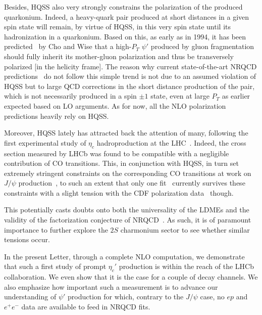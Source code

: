 \documentclass[showpacs,aps,PRL,twocolumn,footinbib,11]{revtex4-1}
\def\jpsi{J/\psi}
\def\psip{\psi'}
\def\etac{\eta_c}
\def\etacp{\eta_c'}
\begin{document}
Besides, HQSS also very strongly constrains the polarization of the produced quarkonium.
Indeed, a heavy-quark pair produced at short distances in a given spin state 
will remain, by virtue of HQSS, in this very spin state until its hadronization in a quarkonium. Based on this, 
as early as in 1994, it has been predicted~\cite{Cho:1994ih} by Cho and Wise that a high-$P_T$ $\psi'$ 
produced by gluon fragmentation should fully inherit
its mother-gluon polarization and thus be transversely polarized [in the helicity frame]. 
The reason why current state-of-the-art NRQCD predictions~\cite{Cho:1994ih} do not follow this 
simple trend is not due to an assumed
violation of HQSS but to large QCD corrections in the short distance production of
the pair, which is not necessarily produced in a spin $\pm 1$ state, even at large $P_T$ 
as earlier expected based on LO arguments. As for now, all the NLO polarization predictions heavily 
rely on HQSS. 

Moreover, HQSS lately has attracted back the attention of many, following the 
first experimental study of $\etac$ hadroproduction at the LHC~\cite{Aaij:2014bga}. 
Indeed, the cross section measured by LHCb was found to be compatible with a negligible
contribution of CO transitions. This, in conjunction with HQSS, in turn set extremely stringent constraints
on the corresponding CO transitions at work on $J/\psi$ production~\cite{Han:2014jya,Zhang:2014ybe,Butenschoen:2014dra},
to such an extent that only one fit~\cite{Han:2014jya} currently survives
these constraints with a slight tension with the CDF polarization data~\cite{Abulencia:2007us} though.

This potentially casts  doubts onto both the 
universality of the LDMEs and the validity of the factorization conjecture of NRQCD~\cite{Nayak:2005rw,Nayak:2005rt,Nayak:2006fm}. As such, it is of paramount importance to further explore 
the $2S$ charmonium sector to see whether similar tensions occur.


In the present Letter, through a complete NLO computation, we demonstrate that 
such a first study of prompt $\etacp$ production is within the reach of
the LHCb collaboration. We even show that it is the case for a couple of 
decay channels. We also emphasize how important such
a measurement  is to advance our understanding of $\psip$ production for which,
contrary to the $\jpsi$ case, no $ep$ and $e^+e^-$ data are available to
feed in NRQCD fits.
\end{document}
